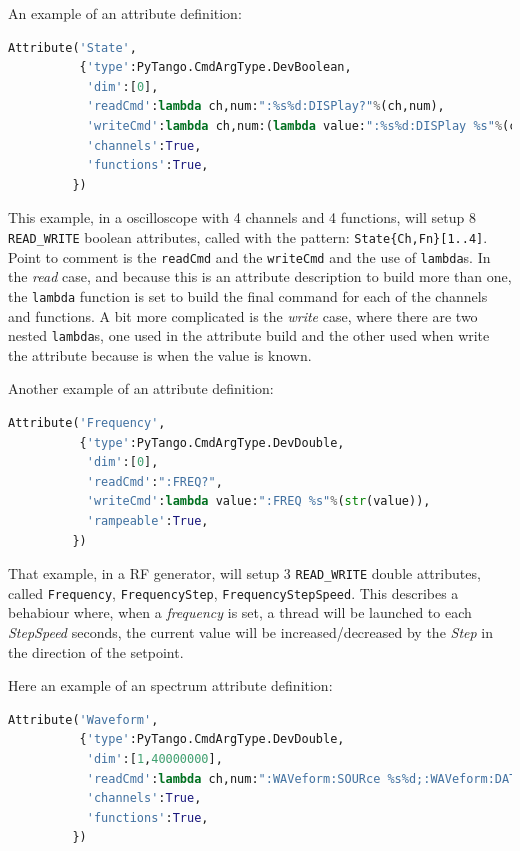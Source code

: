 \documentclass[a4paper,10pt]{article}
\begin{document}
An example of an attribute definition:

\begin{lstlisting}[language=python,basicstyle=\footnotesize]
Attribute('State',
          {'type':PyTango.CmdArgType.DevBoolean,
           'dim':[0],
           'readCmd':lambda ch,num:":%s%d:DISPlay?"%(ch,num),
           'writeCmd':lambda ch,num:(lambda value:":%s%d:DISPlay %s"%(ch,num,value)),
           'channels':True,
           'functions':True,
         })
\end{lstlisting}

This example, in a oscilloscope with 4 channels and 4 functions, will setup 8 {\tt READ\_WRITE} boolean attributes, called with the pattern: {\tt State\{Ch,Fn\}[1..4]}. Point to comment is the {\tt readCmd} and the {\tt writeCmd} and the use of {\tt lambda}s. In the \emph{read} case, and because this is an attribute description to build more than one, the {\tt lambda} function is set to build the final command for each of the channels and functions. A bit more complicated is the \emph{write} case, where there are two nested {\tt lambda}s, one used in the attribute build and the other used when write the attribute because is when the value is known.

Another example of an attribute definition:

\begin{lstlisting}[language=python,basicstyle=\footnotesize]
Attribute('Frequency',
          {'type':PyTango.CmdArgType.DevDouble,
           'dim':[0],
           'readCmd':":FREQ?",
           'writeCmd':lambda value:":FREQ %s"%(str(value)),
           'rampeable':True,
         })
\end{lstlisting}

That example, in a RF generator, will setup 3 {\tt READ\_WRITE} double attributes, called {\tt Frequency}, {\tt FrequencyStep}, {\tt FrequencyStepSpeed}. This describes a behabiour where, when a \emph{frequency} is set, a thread will be launched to each \emph{StepSpeed} seconds, the current value will be increased/decreased by the \emph{Step} in the direction of the setpoint.

Here an example of an spectrum attribute definition:

\begin{lstlisting}[language=python,basicstyle=\footnotesize]
Attribute('Waveform',
          {'type':PyTango.CmdArgType.DevDouble,
           'dim':[1,40000000],
           'readCmd':lambda ch,num:":WAVeform:SOURce %s%d;:WAVeform:DATA?"%(ch,num),
           'channels':True,
           'functions':True,
         })
\end{lstlisting}
\end{document}
